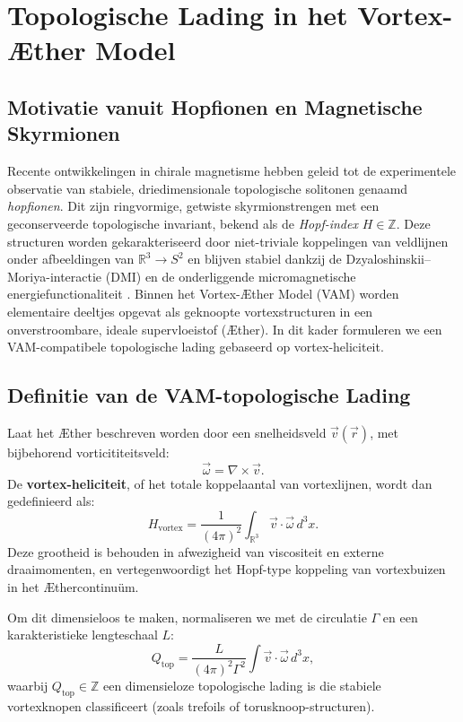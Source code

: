 \section{Topologische Lading in het Vortex-Æther Model}

\subsection{Motivatie vanuit Hopfionen en Magnetische Skyrmionen}

Recente ontwikkelingen in chirale magnetisme hebben geleid tot de experimentele observatie van stabiele, driedimensionale topologische solitonen genaamd \emph{hopfionen}. Dit zijn ringvormige, getwiste skyrmionstrengen met een geconserveerde topologische invariant, bekend als de \emph{Hopf-index} $H \in \mathbb{Z}$. Deze structuren worden gekarakteriseerd door niet-triviale koppelingen van veldlijnen onder afbeeldingen van $\mathbb{R}^3 \to S^2$ en blijven stabiel dankzij de Dzyaloshinskii–Moriya-interactie (DMI) en de onderliggende micromagnetische energiefunctionaliteit \cite{Zheng2023Hopfions}. Binnen het Vortex-Æther Model (VAM) worden elementaire deeltjes opgevat als geknoopte vortexstructuren in een onverstroombare, ideale supervloeistof (Æther). In dit kader formuleren we een VAM-compatibele topologische lading gebaseerd op vortex-heliciteit.

\subsection{Definitie van de VAM-topologische Lading}

Laat het Æther beschreven worden door een snelheidsveld $\vec{v}(\vec{r})$, met bijbehorend vorticititeitsveld:
\begin{equation}
    \vec{\omega} = \nabla \times \vec{v}.
\end{equation}
De \textbf{vortex-heliciteit}, of het totale koppelaantal van vortexlijnen, wordt dan gedefinieerd als:
\begin{equation}
    H_{\text{vortex}} = \frac{1}{(4\pi)^2} \int_{\mathbb{R}^3} \vec{v} \cdot \vec{\omega} \, d^3x.
    \label{eq:heliciteit}
\end{equation}
Deze grootheid is behouden in afwezigheid van viscositeit en externe draaimomenten, en vertegenwoordigt het Hopf-type koppeling van vortexbuizen in het Æthercontinuüm.

Om dit dimensieloos te maken, normaliseren we met de circulatie $\Gamma$ en een karakteristieke lengteschaal $L$:
\begin{equation}
    Q_{\text{top}} = \frac{L}{(4\pi)^2 \Gamma^2} \int \vec{v} \cdot \vec{\omega} \, d^3x,
    \label{eq:qtop}
\end{equation}
waarbij $Q_{\text{top}} \in \mathbb{Z}$ een dimensieloze topologische lading is die stabiele vortexknopen classificeert (zoals trefoils of torusknoop-structuren).


